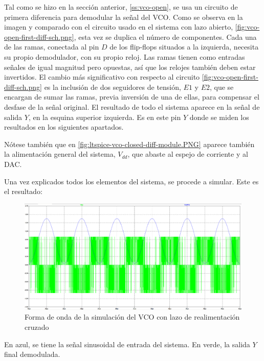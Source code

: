 \documentclass[12pt]{report} %
\begin{document}
	Tal como se hizo en la sección anterior, \ref{ss:vco-open}, se usa un circuito de primera diferencia para demodular la señal del VCO. Como se observa en la imagen y comparado con el circuito usado en el sistema con lazo abierto, \ref{fig:vco-open-first-diff-sch.png}, esta vez se duplica el número de componentes. Cada una de las ramas, conectada al pin $D$ de los flip-flops situados a la izquierda, necesita su propio demodulador, con su propio reloj. Las ramas tienen como entradas señales de igual magnitud pero opuestas, así que los relojes también deben estar invertidos. El cambio más significativo con respecto al circuito \ref{fig:vco-open-first-diff-sch.png} es la inclusión de dos seguidores de tensión, $E1$ y $E2$, que se encargan de sumar las ramas, previa inversión de una de ellas, para compensar el desfase de la señal original. El resultado de todo el sistema aparece en la señal de salida $Y$, en la esquina superior izquierda. Es en este pin $Y$ donde se miden los resultados en los siguientes apartados.
	
	Nótese también que en \ref{fig:ltspice-vco-closed-diff-module.PNG} aparece también la alimentación general del sistema, $V_{dd}$, que abaste al espejo de corriente y al DAC.
	
	
	Una vez explicados todos los elementos del sistema, se procede a simular. Este es el resultado:
	
	\begin{figure}[H]
		\includegraphics[width=\textwidth]{sim-vco-closed-waveform-dem.png}
		\caption[Forma de onda de la simulación del VCO con lazo de realimentación cruzado]{Forma de onda de la simulación del VCO con lazo de realimentación cruzado}
		\label{fig:sim-vco-closed-waveform-dem.png}
	\end{figure}

	En azul, se tiene la señal sinusoidal de entrada del sistema. En verde, la salida $Y$ final demodulada.
	
\end{document}
